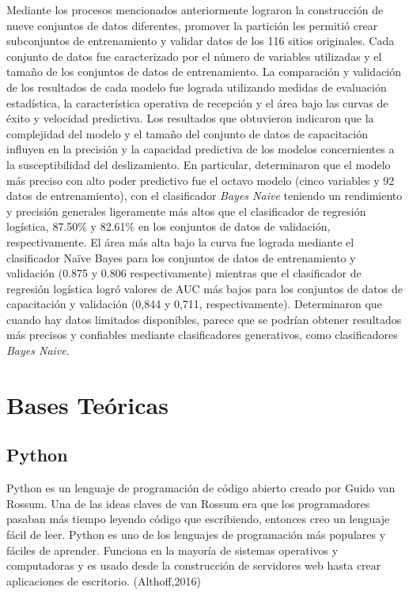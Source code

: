 Mediante los procesos mencionados anteriormente lograron la construcción de nueve conjuntos de datos diferentes, promover la partición les permitió crear subconjuntos de entrenamiento y validar datos de los 116 sitios originales. Cada conjunto de datos fue caracterizado por el número de variables utilizadas y el tamaño de los conjuntos de datos de entrenamiento. La comparación y validación de los resultados de cada modelo fue lograda utilizando medidas de evaluación estadística, la característica operativa de recepción y el área bajo las curvas de éxito y velocidad predictiva. Los resultados que obtuvieron indicaron que la complejidad del modelo y el tamaño del conjunto de datos de capacitación influyen en la precisión y la capacidad predictiva de los modelos concernientes a la susceptibilidad del deslizamiento. En particular, determinaron que el modelo más preciso con alto poder predictivo fue el octavo modelo (cinco variables y 92 datos de entrenamiento), con el clasificador \textit{Bayes Naive} teniendo un rendimiento y precisión generales ligeramente más altos que el clasificador de regresión logística, 87.50\% y 82.61\% en los conjuntos de datos de validación, respectivamente. El área más alta bajo la curva fue lograda mediante el clasificador Naïve Bayes para los conjuntos de datos de entrenamiento y validación (0.875 y 0.806 respectivamente) mientras que el clasificador de regresión logística logró valores de AUC más bajos para los conjuntos de datos de capacitación y validación (0,844 y 0,711, respectivamente). Determinaron que cuando hay datos limitados disponibles, parece que se podrían obtener resultados más precisos y confiables mediante clasificadores generativos, como clasificadores \textit{Bayes Naive}.

\section{Bases Te\'oricas}

\subsection{Python}

Python es un lenguaje de programación de código abierto creado por Guido van Rossum. Una de las ideas claves de van Rossum era que los programadores pasaban más tiempo leyendo código que escribiendo, entonces creo un lenguaje fácil de leer. Python es uno de los lenguajes de programación más populares y fáciles de aprender. Funciona en la mayoría de sistemas operativos y computadoras y es usado desde la construcción de servidores web hasta crear aplicaciones de escritorio. (Althoff,2016)

